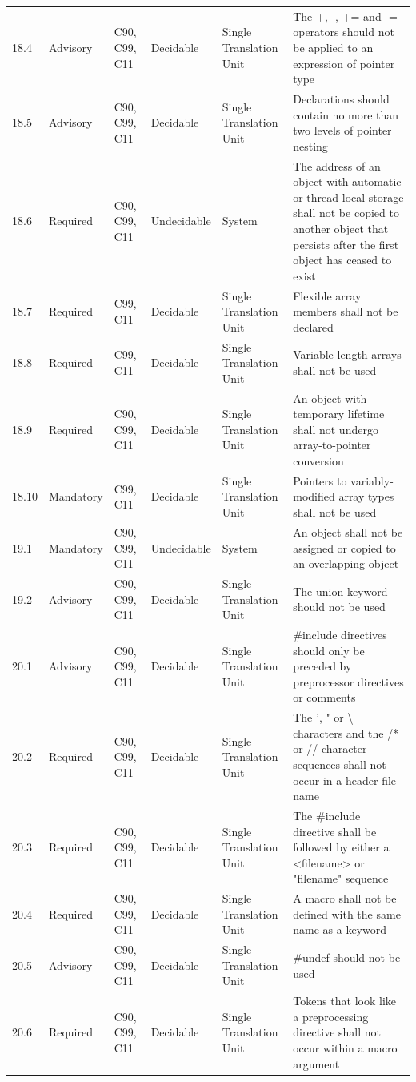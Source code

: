 \documentclass[11pt]{article}
\begin{document}
{\begin{longtable}{@{}p{1.0cm}p{1.6cm}p{1.8cm}p{2.0cm}p{1.6cm}p{7.4cm}@{}}
18.4 & Advisory & C90, C99, C11 & Decidable & Single Translation Unit & The +, -, += and -= operators should not be applied to an expression of pointer type \\
18.5 & Advisory & C90, C99, C11 & Decidable & Single Translation Unit & Declarations should contain no more than two levels of pointer nesting \\
18.6 & Required & C90, C99, C11 & Undecidable & System & The address of an object with automatic or thread-local storage shall not be copied to another object that persists after the first object has ceased to exist \\
18.7 & Required & C99, C11 & Decidable & Single Translation Unit & Flexible array members shall not be declared \\
18.8 & Required & C99, C11 & Decidable & Single Translation Unit & Variable-length arrays shall not be used \\
18.9 & Required & C90, C99, C11 & Decidable & Single Translation Unit & An object with temporary lifetime shall not undergo array-to-pointer conversion \\
18.10 & Mandatory & C99, C11 & Decidable & Single Translation Unit & Pointers to variably-modified array types shall not be used \\
19.1 & Mandatory & C90, C99, C11 & Undecidable & System & An object shall not be assigned or copied to an overlapping object \\
19.2 & Advisory & C90, C99, C11 & Decidable & Single Translation Unit & The union keyword should not be used \\
20.1 & Advisory & C90, C99, C11 & Decidable & Single Translation Unit & \#include directives should only be preceded by preprocessor directives or comments \\
20.2 & Required & C90, C99, C11 & Decidable & Single Translation Unit & The ', " or \textbackslash{} characters and the /* or // character sequences shall not occur in a header file name \\
20.3 & Required & C90, C99, C11 & Decidable & Single Translation Unit & The \#include directive shall be followed by either a <filename> or "filename" sequence \\
20.4 & Required & C90, C99, C11 & Decidable & Single Translation Unit & A macro shall not be defined with the same name as a keyword \\
20.5 & Advisory & C90, C99, C11 & Decidable & Single Translation Unit & \#undef should not be used \\
20.6 & Required & C90, C99, C11 & Decidable & Single Translation Unit & Tokens that look like a preprocessing directive shall not occur within a macro argument \\

\end{longtable}}
\end{document}
